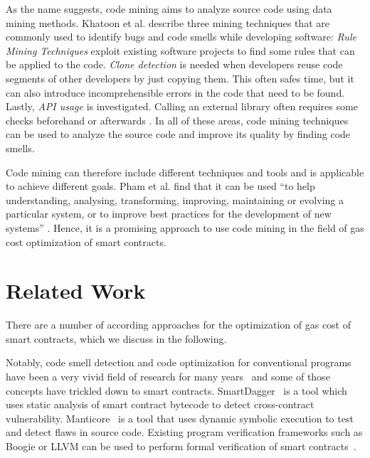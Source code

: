 \documentclass[10pt,conference]{IEEEtran}
\begin{document}
	As the name suggests, code mining aims to analyze source code using data mining methods. Khatoon et al. describe three mining techniques that are commonly used to identify bugs and code smells while developing software: \textit{Rule Mining Techniques} exploit existing software projects to find some rules that can be applied to the code. \textit{Clone detection} is needed when developers reuse code segments of other developers by just copying them. This often safes time, but it can also introduce incomprehensible errors in the code that need to be found. Lastly, \textit{API usage} is investigated. Calling an external library often requires some checks beforehand or afterwards \cite{khatoon}. In all of these areas, code mining techniques can be used to analyze the source code and improve its quality by finding code smells.
	
	Code mining can therefore include different techniques and tools and is applicable to achieve different goals. Pham et al. find that it can be used “to help understanding, analysing, transforming, improving, maintaining or evolving a particular system, or to improve best practices for the development of new systems” \cite{treemining}. Hence, it is a promising approach to use code mining in the field of gas cost optimization of smart contracts.
	
	\section{Related Work}
	\label{sec:related}
	
	
	There are a number of according approaches for the optimization of gas cost of smart contracts, which we discuss in the following. 
	
	Notably, code smell detection and code optimization for conventional programs have been a very vivid field of research for many years~\cite{codesmellmining} and some of those concepts have trickled down to smart contracts. SmartDagger~\cite{smartdagger} is a tool which uses static analysis of smart contract bytecode to detect cross-contract vulnerability. Manticore~\cite{manticore} is a tool that uses dynamic symbolic execution to test and detect flaws in source code. Existing program verification frameworks such as Boogie or LLVM can be used to perform formal verification of smart contracts~\cite{formalverification}.
	
\end{document}
